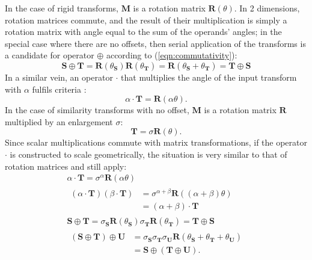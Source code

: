         In the case of rigid transforms, $\mathbf{M}$ is a rotation matrix $\mathbf{R}(\theta)$. In 2 dimensions, rotation matrices commute, and the result of their multiplication is simply a rotation matrix with angle equal to the sum of the operands' angles; in the special case where there are no offsets, then serial application of the transforms is a candidate for operator $\oplus$ according to (\ref{eqn:commutativity}):
       \begin{equation}
           \mathbf{S} \oplus \mathbf{T} = \mathbf{R}(\theta_\mathbf{S})\mathbf{R}(\theta_\mathbf{T}) = \mathbf{R}(\theta_\mathbf{S} + \theta_\mathbf{T}) = \mathbf{T} \oplus \mathbf{S}
       \end{equation}
       In a similar vein, an operator $\cdot$ that multiplies the angle of the input transform with $\alpha$ fulfils criteria :
        \begin{equation}
            \alpha \cdot \mathbf{T} = \mathbf{R}(\alpha\theta).
        \end{equation}
            In the case of similarity transforms with no offset, $\mathbf{M}$ is a rotation matrix $\mathbf{R}$ multiplied by an enlargement $\sigma$:
            \begin{equation}
                  \mathbf{T} = \sigma\mathbf{R}(\theta).
            \end{equation}
            Since scalar multiplications commute with matrix transformations, if the operator $\cdot$ is constructed to scale geometrically, the situation is very similar to that of rotation matrices and  still apply:
            \begin{gather}
                \alpha \cdot \mathbf{T} = \sigma^{\alpha}\mathbf{R}(\alpha\theta) \\
                \begin{split}
                    (\alpha \cdot \mathbf{T})(\beta \cdot \mathbf{T}) &= \sigma^{\alpha + \beta}\mathbf{R}((\alpha + \beta)\theta) \\
                                                                      &= (\alpha + \beta) \cdot \mathbf{T}
                \end{split} \\
                \mathbf{S} \oplus \mathbf{T} = \sigma_\mathbf{S}\mathbf{R}(\theta_\mathbf{S})\sigma_\mathbf{T}\mathbf{R}(\theta_\mathbf{T}) = \mathbf{T} \oplus \mathbf{S} \\
                \begin{split}
                   (\mathbf{S} \oplus \mathbf{T}) \oplus \mathbf{U} &= \sigma_\mathbf{S}\sigma_\mathbf{T}\sigma_\mathbf{U}\mathbf{R}(\theta_\mathbf{S} + \theta_\mathbf{T} + \theta_\mathbf{U}) \\
                                                                     &= \mathbf{S} \oplus (\mathbf{T} \oplus \mathbf{U}).
                \end{split}
            \end{gather}
